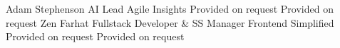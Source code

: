 
\begin{referees}
		{Adam Stephenson}
		{AI Lead}
		{Agile Insights}
		{Provided on request}
		{Provided on request}
		{Zen Farhat}
		{Fullstack Developer \& SS Manager}
		{Frontend Simplified}
		{Provided on request}
		{Provided on request}
\end{referees}